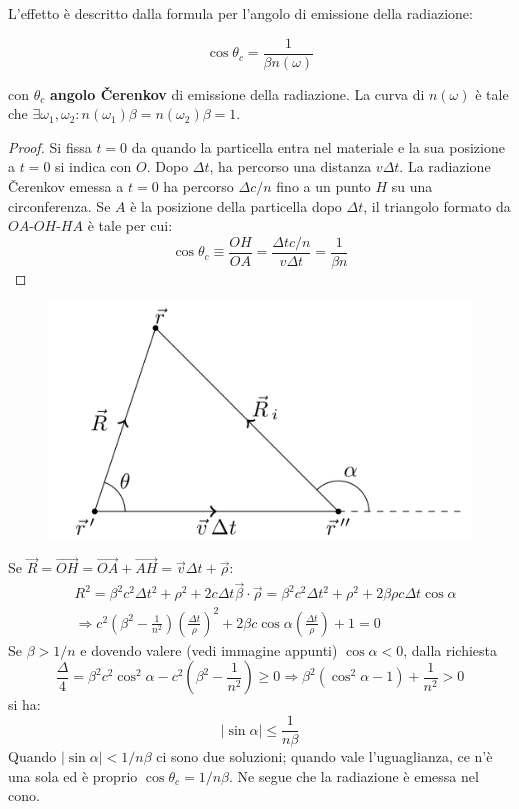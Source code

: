 \documentclass[10pt, a4paper]{scrartcl}
\numberwithin{equation}{subsection}
\theoremstyle{style1}
\newenvironment{boxenv}[1][]{
    \begin{eqbox}[#1]
    }{
   \end{eqbox}
}
\begin{document}
L'effetto \`e descritto dalla formula per l'angolo di emissione della radiazione:
\begin{boxenv}[]
\begin{equation}
	\cos \theta _c = \frac{1}{ \beta  n(\omega)}
\end{equation}
\end{boxenv}
\noindent con $\theta _c$ \textbf{angolo \v Cerenkov} di emissione della radiazione. La curva di $n(\omega)$ \`e tale che $\exists \omega_1, \omega_2 : n(\omega_1) \beta = n(\omega_2)\beta  = 1$.
\begin{proof}
	Si fissa $t=0$ da quando la particella entra nel materiale e la sua posizione a $t=0$ si indica con $O$. Dopo $\Delta t$, ha percorso una distanza $v\Delta t $. La radiazione \v Cerenkov emessa a $t=0$ ha percorso $\Delta c / n$ fino a un punto $H$ su una circonferenza. Se $A$ \`e la posizione della particella dopo $\Delta  t$, il triangolo formato da $OA$-$OH$-$HA$ \`e tale per cui:
	\[
	\cos \theta  _c \equiv \frac{OH}{OA} = \frac{\Delta t c / n}{v \Delta  t} = \frac{1}{\beta  n}
	\] 
\end{proof}
\begin{figure}[h!]
	\centering
	\includegraphics[width=.4\columnwidth]{c2.png}
\end{figure}
\noindent Se $\vec{R} = \vec{OH} = \vec{OA}+\vec{AH}= \vec{v}\Delta  t + \vec{\rho }$:
\[
	\begin{split}
		&R^2 = \beta ^2 c^2 \Delta  t ^2 + \rho ^2 + 2c\Delta  t \vec{\beta }\cdot \vec{\rho }  = \beta ^2 c^2 \Delta t^2 + \rho ^2 + 2 \beta  \rho  c \Delta  t \cos \alpha \\
		&\Rightarrow c^2 \left(\beta ^2 - \frac{1}{n^2}\right) \left(\frac{\Delta  t}{\rho }\right) ^2 + 2 \beta  c \cos \alpha  \left(\frac{\Delta  t}{\rho }\right) +1 = 0
	\end{split}
\] 
Se $\beta  > 1 / n$ e dovendo valere (vedi immagine appunti) $\cos \alpha  < 0$, dalla richiesta
\[
\frac{\Delta }{4} = \beta ^2 c^2 \cos^2 \alpha  - c^2 \left(\beta ^2 - \frac{1}{n^2}\right) \ge 0\Rightarrow \beta ^2 (\cos^2 \alpha  -1) + \frac{1}{n^2}>0
\] 
si ha:
\begin{equation}
	\left\lvert \sin \alpha  \right\rvert \le \frac{1}{n \beta }
\end{equation}
Quando $\left\lvert \sin \alpha  \right\rvert < 1 / n\beta $ ci sono due soluzioni; quando vale l'uguaglianza, ce n'\`e una sola ed \`e proprio $\cos \theta _c = 1 / n\beta $. Ne segue che la radiazione \`e emessa nel cono.
\end{document}
